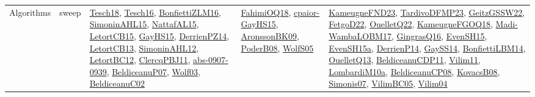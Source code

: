 {\begin{longtable}{lp{3cm}>{\raggedright}p{6cm}>{\raggedright}p{6cm}p{8cm}}
Algorithms & sweep & \href{papers/Tesch18.pdf}{Tesch18}\cite{Tesch18}, \href{papers/Tesch16.pdf}{Tesch16}\cite{Tesch16}, \href{papers/BonfiettiZLM16.pdf}{BonfiettiZLM16}\cite{BonfiettiZLM16}, \href{articles/SimoninAHL15.pdf}{SimoninAHL15}\cite{SimoninAHL15}, \href{articles/NattafAL15.pdf}{NattafAL15}\cite{NattafAL15}, \href{articles/LetortCB15.pdf}{LetortCB15}\cite{LetortCB15}, \href{papers/GayHS15.pdf}{GayHS15}\cite{GayHS15}, \href{papers/DerrienPZ14.pdf}{DerrienPZ14}\cite{DerrienPZ14}, \href{papers/LetortCB13.pdf}{LetortCB13}\cite{LetortCB13}, \href{papers/SimoninAHL12.pdf}{SimoninAHL12}\cite{SimoninAHL12}, \href{papers/LetortBC12.pdf}{LetortBC12}\cite{LetortBC12}, \href{papers/ClercqPBJ11.pdf}{ClercqPBJ11}\cite{ClercqPBJ11}, \href{articles/abs-0907-0939.pdf}{abs-0907-0939}\cite{abs-0907-0939}, \href{papers/BeldiceanuP07.pdf}{BeldiceanuP07}\cite{BeldiceanuP07}, \href{papers/Wolf03.pdf}{Wolf03}\cite{Wolf03}, \href{papers/BeldiceanuC02.pdf}{BeldiceanuC02}\cite{BeldiceanuC02} & \href{articles/FahimiOQ18.pdf}{FahimiOQ18}\cite{FahimiOQ18}, \href{papers/cpaior-GayHS15.pdf}{cpaior-GayHS15}\cite{cpaior-GayHS15}, \href{papers/AronssonBK09.pdf}{AronssonBK09}\cite{AronssonBK09}, \href{papers/PoderB08.pdf}{PoderB08}\cite{PoderB08}, \href{papers/WolfS05.pdf}{WolfS05}\cite{WolfS05} & \href{papers/KameugneFND23.pdf}{KameugneFND23}\cite{KameugneFND23}, \href{papers/TardivoDFMP23.pdf}{TardivoDFMP23}\cite{TardivoDFMP23}, \href{papers/GeitzGSSW22.pdf}{GeitzGSSW22}\cite{GeitzGSSW22}, \href{articles/FetgoD22.pdf}{FetgoD22}\cite{FetgoD22}, \href{papers/OuelletQ22.pdf}{OuelletQ22}\cite{OuelletQ22}, \href{papers/KameugneFGOQ18.pdf}{KameugneFGOQ18}\cite{KameugneFGOQ18}, \href{papers/Madi-WambaLOBM17.pdf}{Madi-WambaLOBM17}\cite{Madi-WambaLOBM17}, \href{papers/GingrasQ16.pdf}{GingrasQ16}\cite{GingrasQ16}, \href{papers/EvenSH15.pdf}{EvenSH15}\cite{EvenSH15}, \href{articles/EvenSH15a.pdf}{EvenSH15a}\cite{EvenSH15a}, \href{papers/DerrienP14.pdf}{DerrienP14}\cite{DerrienP14}, \href{papers/GaySS14.pdf}{GaySS14}\cite{GaySS14}, \href{articles/BonfiettiLBM14.pdf}{BonfiettiLBM14}\cite{BonfiettiLBM14}, \href{papers/OuelletQ13.pdf}{OuelletQ13}\cite{OuelletQ13}, \href{articles/BeldiceanuCDP11.pdf}{BeldiceanuCDP11}\cite{BeldiceanuCDP11}, \href{papers/Vilim11.pdf}{Vilim11}\cite{Vilim11}, \href{articles/LombardiM10a.pdf}{LombardiM10a}\cite{LombardiM10a}, \href{papers/BeldiceanuCP08.pdf}{BeldiceanuCP08}\cite{BeldiceanuCP08}, \href{articles/KovacsB08.pdf}{KovacsB08}\cite{KovacsB08}, \href{articles/Simonis07.pdf}{Simonis07}\cite{Simonis07}, \href{articles/VilimBC05.pdf}{VilimBC05}\cite{VilimBC05}, \href{papers/Vilim04.pdf}{Vilim04}\cite{Vilim04}\\

\end{longtable}}
